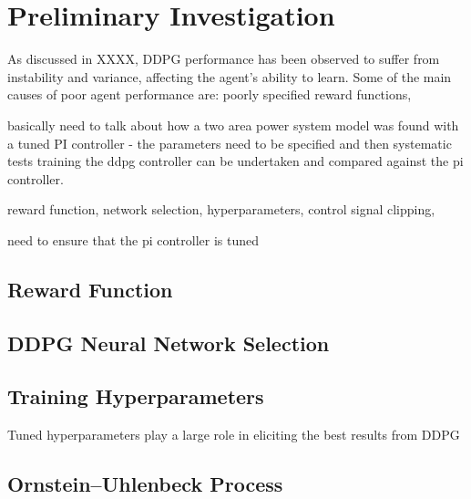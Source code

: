 \section{Preliminary Investigation}\label{sec:preliminary_investigation}
As discussed in \textsection XXXX, DDPG performance has been observed to suffer from instability and variance,  affecting the agent's ability to learn. Some of the main causes of poor agent performance are: poorly specified reward functions, 

basically need to talk about how a two area power system model was found with a tuned PI controller - the parameters need to be specified and then systematic tests training the ddpg controller can be undertaken and compared against the pi controller.

reward function, network selection, hyperparameters, control signal clipping,

need to ensure that the pi controller is tuned




\subsection{Reward Function}


\subsection{DDPG Neural Network Selection}


\subsection{Training Hyperparameters}
Tuned hyperparameters play a large role in eliciting the best results from DDPG


\subsection{Ornstein–Uhlenbeck Process}

